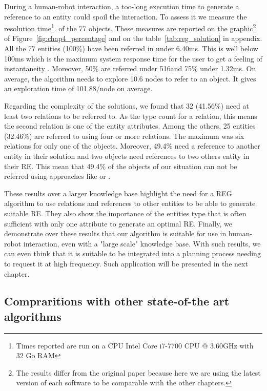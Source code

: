 During a human-robot interaction, a too-long execution time to generate a reference to an entity could spoil the interaction. To assess it we measure the resolution time\footnote{Times reported are run on a CPU Intel Core i7-7700 CPU @ 3.60GHz with 32 Go RAM}. of the 77 objects. These measures are reported on the graphic\footnote{The results differ from the original paper because here we are using the latest version of each software to be comparable with the other chapters.} of Figure~\ref{fig:chap4_percentage} and on the table~\ref{tab:reg_solution} in appendix. All the 77 entities (100\%) have been referred in under 6.40ms. This is well below 100ms which is the maximum system response time for the user to get a feeling of instantaneity \cite{miller_1968_response}. Moreover, 50\% are referred under 516\us and 75\% under 1.32ms. On average, the algorithm needs to explore 10.6 nodes to refer to an object. It gives an exploration time of 101.88\us/node on average.

Regarding the complexity of the solutions, we found that 32 (41.56\%) need at least two relations to be referred to. As the type count for a relation, this means the second relation is one of the entity attributes. Among the others, 25 entities (32.46\%) are referred to using four or more relations. The maximum was six relations for only one of the objects. Moreover, 49.4\% need a reference to another entity in their solution and two objects need references to two others entity in their RE. This mean that 49.4\% of the objects of our situation can not be referred using approaches like \cite{ros_2010_which} or \cite{dale_1995_computational}.

These results over a larger knowledge base highlight the need for a REG algorithm to use relations and references to other entities to be able to generate suitable RE. They also show the importance of the entities type that is often sufficient with only one attribute to generate an optimal RE. Finally, we demonstrate over these results that our algorithm is suitable for use in human-robot interaction, even with a "large scale" knowledge base. With such results, we can even think that it is suitable to be integrated into a planning process needing to request it at high frequency. Such application will be presented in the next chapter.


\subsection{Compraritions with other state-of-the art algorithms}

